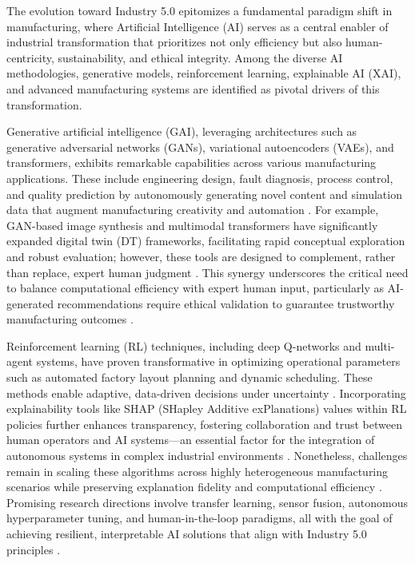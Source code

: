 \documentclass[11pt]{article}
\begin{document}
The evolution toward Industry 5.0 epitomizes a fundamental paradigm shift in manufacturing, where Artificial Intelligence (AI) serves as a central enabler of industrial transformation that prioritizes not only efficiency but also human-centricity, sustainability, and ethical integrity. Among the diverse AI methodologies, generative models, reinforcement learning, explainable AI (XAI), and advanced manufacturing systems are identified as pivotal drivers of this transformation.

Generative artificial intelligence (GAI), leveraging architectures such as generative adversarial networks (GANs), variational autoencoders (VAEs), and transformers, exhibits remarkable capabilities across various manufacturing applications. These include engineering design, fault diagnosis, process control, and quality prediction by autonomously generating novel content and simulation data that augment manufacturing creativity and automation \cite{ref1,ref5,ref24}. For example, GAN-based image synthesis and multimodal transformers have significantly expanded digital twin (DT) frameworks, facilitating rapid conceptual exploration and robust evaluation; however, these tools are designed to complement, rather than replace, expert human judgment \cite{ref6,ref14}. This synergy underscores the critical need to balance computational efficiency with expert human input, particularly as AI-generated recommendations require ethical validation to guarantee trustworthy manufacturing outcomes \cite{ref2}.

Reinforcement learning (RL) techniques, including deep Q-networks and multi-agent systems, have proven transformative in optimizing operational parameters such as automated factory layout planning and dynamic scheduling. These methods enable adaptive, data-driven decisions under uncertainty \cite{ref5,ref30}. Incorporating explainability tools like SHAP (SHapley Additive exPlanations) values within RL policies further enhances transparency, fostering collaboration and trust between human operators and AI systems—an essential factor for the integration of autonomous systems in complex industrial environments \cite{ref5,ref35}. Nonetheless, challenges remain in scaling these algorithms across highly heterogeneous manufacturing scenarios while preserving explanation fidelity and computational efficiency \cite{ref35,ref30}. Promising research directions involve transfer learning, sensor fusion, autonomous hyperparameter tuning, and human-in-the-loop paradigms, all with the goal of achieving resilient, interpretable AI solutions that align with Industry 5.0 principles \cite{ref5,ref36}.
\end{document}
